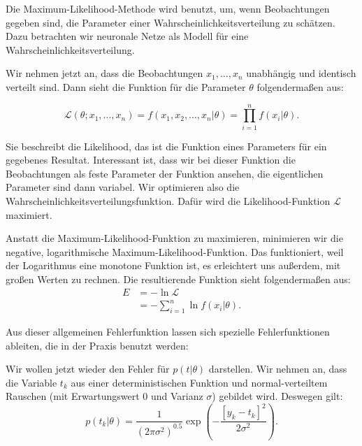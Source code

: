 Die Maximum-Likelihood-Methode wird benutzt, um, wenn Beobachtungen gegeben sind, die Parameter einer Wahrscheinlichkeitsverteilung zu schätzen. Dazu betrachten wir neuronale Netze als Modell für eine Wahrscheinlichkeitsverteilung\cite{bishop1995neural}.

Wir nehmen jetzt an, dass die Beobachtungen $x_1, \ldots , x_n$ unabhängig und identisch verteilt sind. Dann sieht die Funktion für die Parameter $\theta$ folgendermaßen aus:

\begin{equation}
  \mathcal{L} (\theta; x_1, \ldots, x_n) =
  f(x_1, x_2, \ldots, x_n | \theta) =
  \prod_{i = 1}^n f(x_i|\theta) .
\end{equation}

Sie beschreibt die Likelihood, das ist die Funktion eines Parameters für ein gegebenes Resultat. Interessant ist, dass wir bei dieser Funktion die Beobachtungen als feste Parameter der Funktion ansehen, die eigentlichen Parameter sind dann variabel. Wir optimieren also die Wahrscheinlichkeitsverteilungsfunktion. Dafür wird die Likelihood-Funktion $\mathcal{L}$ maximiert.

Anstatt die Maximum-Likelihood-Funktion zu maximieren, minimieren wir die negative, logarithmische Maximum-Likelihood-Funktion. Das funktioniert, weil der Logarithmus eine monotone Funktion ist, es erleichtert uns außerdem, mit großen Werten zu rechnen. Die resultierende Funktion sieht folgendermaßen aus:
\begin{align}
 E  & = - \ln \mathcal{L} \\
  & = - \sum_{i=1}^n \ln f(x_i|\theta).
\end{align}

Aus dieser allgemeinen Fehlerfunktion lassen sich spezielle Fehlerfunktionen ableiten, die in der Praxis benutzt werden\cite{bishop1995neural}:

Wir wollen jetzt wieder den Fehler für $p(t|\theta)$ darstellen. Wir nehmen an, dass die Variable $t_k$ aus einer deterministischen Funktion und normal-verteiltem Rauschen (mit Erwartungswert $0$ und Varianz $\sigma$) gebildet wird.  
Deswegen gilt: %
\begin{equation}
  p(t_k|\theta) = \frac{1}{(2 \pi \sigma^2)^{0.5}} \exp \left( -\frac{ \left[  y_k - t_k \right]^2 }{2 \sigma^2} \right).
\end{equation}

